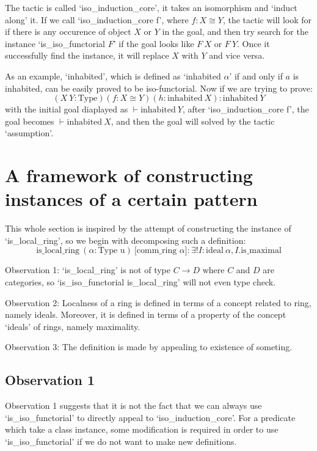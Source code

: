 \documentclass[11pt]{article}
\begin{document}
The tactic is called `iso\_induction\_core', it takes an isomorphism and `induct along' it. If we call `iso\_induction\_core f', where $f:X\cong Y$, the tactic will look for if there is any occurence of object $X$ or $Y$ in the goal, and then try search for the instance `is\_iso\_functorial $F$' if the goal looks like $F \ X$ or $F \ Y$. Once it successfully find the instance, it will replace $X$ with $Y$ and vice versa.

As an example, `inhabited', which is defined as `inhabited $\alpha$' if and only if $a$ is inhabited, can be easily proved to be iso-functorial. Now if we are trying to prove:
\[(X \ Y : \text{Type}) (f : X \cong Y) (h : \text{inhabited} \ X) : \text{inhabited} \ Y\]
with the initial goal diaplayed as $ \vdash \text{inhabited} \ Y$, after `iso\_induction\_core f', the goal becomes $ \vdash \text{inhabited} \ X$, and then the goal will solved by the tactic `assumption'.

\section{A framework of constructing instances of a certain pattern}

This whole section is inspired by the attempt of constructing the instance of `is\_local\_ring', so we begin with decomposing such a definition:
\[\text{is\_local\_ring} \ (\alpha : \text{Type u}) \  \text{[comm\_ring $\alpha$]} : \exists ! I : \text{ideal} \ \alpha, I.\text{is\_maximal}\]

Observation 1: `is\_local\_ring' is not of type $C\to D$ where $C$ and $D$ are categories, so `is\_iso\_functorial is\_local\_ring' will not even type check.

Observation 2: Localness of a ring is defined in terms of a concept related to ring, namely ideals. Moreover, it is defined in terms of a property of the concept `ideals' of rings, namely maximality.

Observation 3: The definition is made by appealing to existence of someting.

\subsection{Observation 1}

Observation 1 suggests that it is not the fact that we can always use `is\_iso\_functorial' to directly appeal to `iso\_induction\_core'. For a predicate which take a class instance, some modification is required in order to use `is\_iso\_functorial' if we do not want to make new definitions. 
\end{document}
